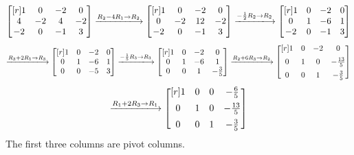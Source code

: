 \documentclass{article}
\theoremstyle{definition}
\newenvironment{solution}[1][]{\begin{replacementsoln}}{\end{replacementsoln}}
\begin{document}
\begin{solution}
  \[
    \begin{bmatrix}[r]
      1&0&-2&0\\
      4&-2&4&-2\\
      -2&0&-1&3\\
      \end{bmatrix}\xlongrightarrow{R_2 -4R_1 \to R_2} \begin{bmatrix}[r]
        1 &0  &-2  &0   \\
         0&-2  &12  &-2   \\
         -2&0  &-1  &3   \\
      \end{bmatrix}\xlongrightarrow{-\frac{1}{2}R_2 \to R_2} \begin{bmatrix}[r]
        1 &0  &-2  &0   \\
         0&1  &-6  &1   \\
         -2&0  &-1  &3   \\
      \end{bmatrix}
  \]
  \[
    \xlongrightarrow{R_3 + 2R_1 \to R_3}\begin{bmatrix}[r]
      1 &0  &-2  &0   \\
       0&1  &-6  &1   \\
       0&0  &-5  &3   \\
    \end{bmatrix}\xlongrightarrow{-\frac{1}{5}R_3 \to R_3}\begin{bmatrix}[r]
      1 &0  &-2  &0   \\
       0&1  &-6  &1   \\
       0&0  &1  &-\frac{3}{5}   \\
    \end{bmatrix}\xlongrightarrow{R_2 +6R_3 \to R_2}\begin{bmatrix}[r]
      1 &0  &-2  &0   \\[5pt]
       0&1  &0  &-\frac{13}{5}   \\[5pt]
       0&0  &1  &-\frac{3}{5}   \\
    \end{bmatrix}
    \]
    \[\xlongrightarrow{R_1+2R_3 \to R_1}\begin{bmatrix}[r]
      1 &0  & 0 &-\frac{6}{5}   \\[5pt]
       0&1  &0  &-\frac{13}{5}   \\[5pt]
       0&0  &1  &-\frac{3}{5}   \\
    \end{bmatrix}
  \]
  The first three columns are pivot columns.\\

\end{solution}
\end{document}
